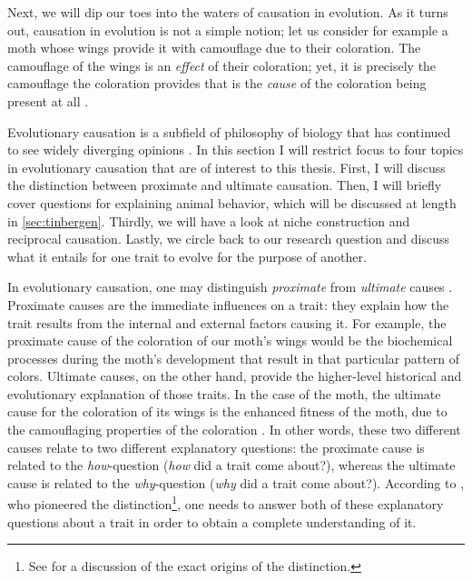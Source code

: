Next, we will dip our toes into the waters of causation in evolution. As it turns out, causation in evolution is not a simple notion; let us consider for example a moth whose wings provide it with camouflage due to their coloration. The camouflage of the wings is an \emph{effect} of their coloration; yet, it is precisely the camouflage the coloration provides that is the \emph{cause} of the coloration being present at all \citep{Lipton09}.

Evolutionary causation is a subfield of philosophy of biology that has continued to see widely diverging opinions \citep{Baedke2021, S-P13}. In this section I will restrict focus to four topics in evolutionary causation that are of interest to this thesis. First, I will discuss the distinction between proximate and ultimate causation. Then, I will briefly cover  questions for explaining animal behavior, which will be discussed at length in \cref{sec:tinbergen}. Thirdly, we will have a look at niche construction and reciprocal causation. Lastly, we circle back to our research question and discuss what it entails for one trait to evolve for the purpose of another.

In evolutionary causation, one may distinguish \emph{proximate} from \emph{ultimate} causes \citep{Mayr61}.
Proximate causes are the immediate influences on a trait: they explain how the trait results from the internal and external factors causing it. For example, the proximate cause of the coloration of our moth's wings would be the biochemical processes during the moth's development that result in that particular pattern of colors.
Ultimate causes, on the other hand, provide the higher-level historical and evolutionary explanation of those traits. In the case of the moth, the ultimate cause for the coloration of its wings is the enhanced fitness of the moth, due to the camouflaging properties of the coloration \citep{Lipton09}. In other words, these two different causes relate to two different explanatory questions: the proximate cause is related to the \emph{how}-question (\emph{how} did a trait come about?), whereas the ultimate cause is related to the \emph{why}-question (\emph{why} did a trait come about?). According to \citet{Mayr61}, who pioneered the distinction\footnote{See \citep{Laland13} for a discussion of the exact origins of the distinction.}, one needs to answer both of these explanatory questions about a trait in order to obtain a complete understanding of it.

